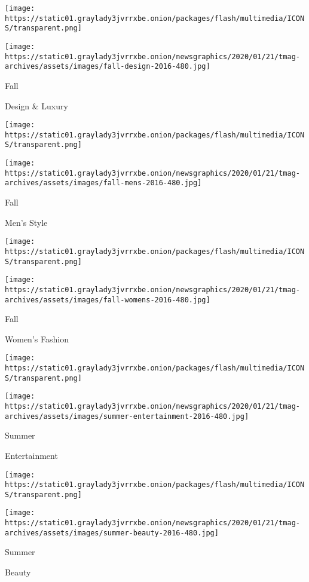 \texttt{[image: https://static01.graylady3jvrrxbe.onion/packages/flash/multimedia/ICONS/transparent.png]}

\texttt{[image: https://static01.graylady3jvrrxbe.onion/newsgraphics/2020/01/21/tmag-archives/assets/images/fall-design-2016-480.jpg]}

Fall

Design \& Luxury

\href{https://www.nytimes3xbfgragh.onion/issue/t-magazine/2016/09/11/mens-style}{}

\texttt{[image: https://static01.graylady3jvrrxbe.onion/packages/flash/multimedia/ICONS/transparent.png]}

\texttt{[image: https://static01.graylady3jvrrxbe.onion/newsgraphics/2020/01/21/tmag-archives/assets/images/fall-mens-2016-480.jpg]}

Fall

Men's Style

\href{https://www.nytimes3xbfgragh.onion/issue/t-magazine/2016/08/21/womens-fashion}{}

\texttt{[image: https://static01.graylady3jvrrxbe.onion/packages/flash/multimedia/ICONS/transparent.png]}

\texttt{[image: https://static01.graylady3jvrrxbe.onion/newsgraphics/2020/01/21/tmag-archives/assets/images/fall-womens-2016-480.jpg]}

Fall

Women's Fashion

\href{https://www.nytimes3xbfgragh.onion/issue/t-magazine/2016/07/17/entertainment}{}

\texttt{[image: https://static01.graylady3jvrrxbe.onion/packages/flash/multimedia/ICONS/transparent.png]}

\texttt{[image: https://static01.graylady3jvrrxbe.onion/newsgraphics/2020/01/21/tmag-archives/assets/images/summer-entertainment-2016-480.jpg]}

Summer

Entertainment

\href{https://www.nytimes3xbfgragh.onion/issue/t-magazine/2016/06/12/beauty}{}

\texttt{[image: https://static01.graylady3jvrrxbe.onion/packages/flash/multimedia/ICONS/transparent.png]}

\texttt{[image: https://static01.graylady3jvrrxbe.onion/newsgraphics/2020/01/21/tmag-archives/assets/images/summer-beauty-2016-480.jpg]}

Summer

Beauty


